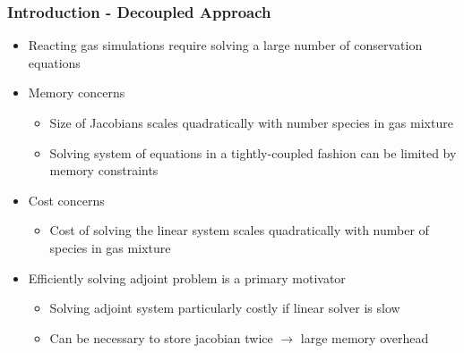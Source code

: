 \documentclass{beamer}
\begin{document}
\begin{frame}
  \frametitle{Introduction - Decoupled Approach}
  \begin{itemize}
    \item Reacting gas simulations require solving a large number of conservation
      equations
    \item Memory concerns
    \begin{itemize}
        \item Size of Jacobians scales quadratically with number species in gas mixture
        \item Solving system of equations in a tightly-coupled fashion can be
          limited by memory constraints
    \end{itemize}
    \item Cost concerns
    \begin{itemize}
      \item Cost of solving the linear system scales quadratically with number
      of species in gas mixture
    \end{itemize}
    \item Efficiently solving adjoint problem is a primary motivator
      \begin{itemize}
        \item Solving adjoint system particularly costly if linear solver is
          slow
        \item Can be necessary to store jacobian twice $\to$ large memory
          overhead
      \end{itemize}
  \end{itemize}
\end{frame}
\end{document}
